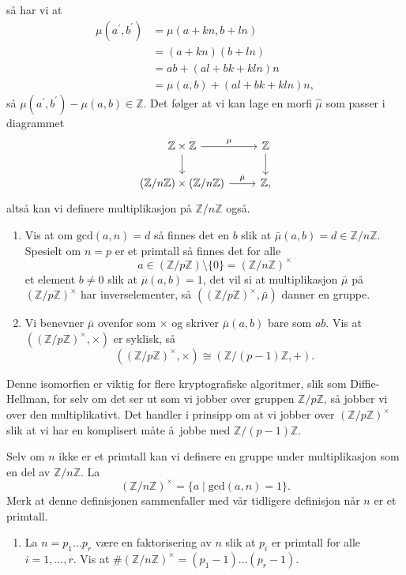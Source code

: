 så har vi at
\[\begin{aligned}
    \mu(a^\prime, b^\prime)
    &= \mu(a + kn, b + ln)
    \\
    &= (a + kn)(b + ln)
    \\
    &= ab + (al + bk + kln)n
    \\
    &= \mu(a, b) + (al + bk + kln)n,
\end{aligned}\]
så $\mu(a^\prime, b^\prime) - \mu(a, b) \in \mathbb Z$.
Det følger at vi kan lage en morfi $\hat\mu$ som passer i diagrammet
\[\begin{tikzcd}
    \mathbb Z\times \mathbb Z
    \rar{\mu}
    \dar
    &
    \mathbb Z
    \dar
    \\
    (\mathbb Z / n\mathbb Z)\times(\mathbb Z / n\mathbb Z)
    \rar{\hat\mu}
    &
    \mathbb Z,
\end{tikzcd}\]
altså kan vi definere multiplikasjon på $\mathbb Z / n\mathbb Z$ også.
\begin{enumerate}[resume]
    \item Vis at om $\mathrm{gcd}(a, n) = d$ så finnes det en
        $b$ slik at $\bar\mu(a, b) = d\in \mathbb Z / n\mathbb Z$.
        Spesielt om $n = p$ er et primtall så finnes det for alle
        \[
            a \in (\mathbb Z / p\mathbb Z)\setminus\{0\}
            = {(\mathbb Z / n\mathbb Z)}^\times
        \]
        et element $b\neq 0$ slik at $\overline\mu(a, b) = 1$,
        det vil si at multiplikasjon $\bar\mu$ på
        ${(\mathbb Z / p\mathbb Z)}^\times$ har inverselementer,
        så $({(\mathbb Z / p\mathbb Z)}^\times, \bar\mu)$ danner en gruppe.
    \item Vi benevner $\bar\mu$ ovenfor som $\times$ og skriver
        $\bar\mu(a,b)$ bare som $ab$.
        Vis at $({(\mathbb Z / p\mathbb Z)}^\times, \times)$ er syklisk,
        så
        \[
            ({(\mathbb Z / p\mathbb Z)}^\times, \times)
            \cong (\mathbb Z / (p - 1)\mathbb Z, +).
        \]
\end{enumerate}
\begin{remark}
    Denne isomorfien er viktig for flere kryptografiske algoritmer,
    slik som Diffie-Hellman,
    for selv om det ser ut som vi jobber over gruppen $\mathbb Z / p\mathbb Z$,
    så jobber vi over den multiplikativt.
    Det handler i prinsipp om at vi jobber over ${(\mathbb Z / p\mathbb Z)}^\times$
    slik at vi har en komplisert måte å jobbe med $\mathbb Z / (p - 1)\mathbb Z$.
\end{remark}

Selv om $n$ ikke er et primtall kan vi definere en gruppe under multiplikasjon
som en del av $\mathbb Z / n\mathbb Z$.
La
\[
    {(\mathbb Z / n\mathbb Z)}^\times
    = \{ a\mid \mathrm{gcd}(a, n) = 1\}.
\]
Merk at denne definisjonen sammenfaller med vår
tidligere definisjon når $n$ er et primtall.
\begin{enumerate}[resume]
    \item La $n = p_1\dots p_r$ være en faktorisering av $n$
        slik at $p_i$ er primtall for alle $i=1,\dots,r$.
        Vis at $\# {(\mathbb Z / n\mathbb Z)}^\times = (p_1 - 1)\dots(p_r - 1)$.
\end{enumerate}
